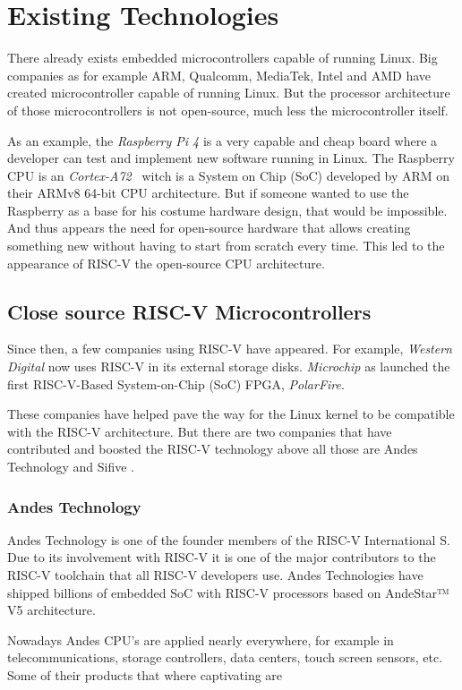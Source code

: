 \chapter{Existing Technologies}
There already exists embedded microcontrollers capable of running Linux. Big companies as for example ARM, Qualcomm, MediaTek, Intel and AMD have created microcontroller capable of running Linux. But the processor architecture of those microcontrollers is not open-source, much less the microcontroller itself. 

As an example, the \textit{Raspberry Pi 4} is a very capable and cheap board where a developer can test and implement new software running in Linux. The Raspberry CPU is an \textit{Cortex-A72}~\cite{cortex_a72} witch is a System on Chip (SoC) developed by ARM on their ARMv8 64-bit CPU architecture. But if someone wanted to use the Raspberry as a base for his costume hardware design, that would be impossible. And thus appears the need for open-source hardware that allows creating something new without having to start from scratch every time. This led to the appearance of RISC-V the open-source CPU architecture.

\section{Close source RISC-V Microcontrollers}
Since then, a few companies using RISC-V have appeared. For example, \textit{Western Digital} now uses RISC-V in its external storage disks. \textit{Microchip} as launched the first RISC-V-Based System-on-Chip (SoC) FPGA, \textit{PolarFire}. 

These companies have helped pave the way for the Linux kernel to be compatible with the RISC-V architecture. But there are two companies that have contributed and boosted the RISC-V technology above all those are Andes Technology and Sifive .

\subsection{Andes Technology}
Andes Technology is one of the founder members of the RISC-V International S. Due to its involvement with RISC-V it is one of the major contributors to the RISC-V toolchain that all RISC-V developers use.  Andes Technologies have shipped billions of embedded SoC with RISC-V processors based on AndeStar™ V5 architecture.

Nowadays Andes CPU's are applied nearly everywhere, for example in telecommunications, storage controllers, data centers, touch screen sensors, etc. Some of their products that where captivating are 

